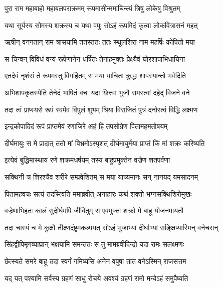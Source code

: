 
\twolineshloka
{पुरा राम महाबाहो महाबलपराक्रमम्}
{रूपमासीन्ममाचिन्त्यं त्रिषु लोकेषु विश्रुतम्} %

\twolineshloka
{यथा सूर्यस्य सोमस्य शक्रस्य च यथा वपुः}
{सोऽहं रूपमिदं कृत्वा लोकवित्रासनं महत्} %

\twolineshloka
{ऋषीन् वनगतान् राम त्रासयामि ततस्ततः}
{ततः स्थूलशिरा नाम महर्षिः कोपितो मया} %

\twolineshloka
{स चिन्वन् विविधं वन्यं रूपेणानेन धर्षितः}
{तेनाहमुक्तः प्रेक्ष्यैवं घोरशापाभिधायिना} %

\twolineshloka
{एतदेवं नृशंसं ते रूपमस्तु विगर्हितम्}
{स मया याचितः क्रुद्धः शापस्यान्तो भवेदिति} %

\twolineshloka
{अभिशापकृतस्येति तेनेदं भाषितं वचः}
{यदा छित्त्वा भुजौ रामस्त्वां दहेद् विजने वने} %

\twolineshloka
{तदा त्वं प्राप्स्यसे रूपं स्वमेव विपुलं शुभम्}
{श्रिया विराजितं पुत्रं दनोस्त्वं विद्धि लक्ष्मण} %

\twolineshloka
{इन्द्रकोपादिदं रूपं प्राप्तमेवं रणाजिरे}
{अहं हि तपसोग्रेण पितामहमतोषयम्} %

\twolineshloka
{दीर्घमायुः स मे प्रादात् ततो मां विभ्रमोऽस्पृशत्}
{दीर्घमायुर्मया प्राप्तं किं मां शक्रः करिष्यति} %

\twolineshloka
{इत्येवं बुद्धिमास्थाय रणे शक्रमधर्षयम्}
{तस्य बाहुप्रमुक्तेन वज्रेण शतपर्वणा} %

\twolineshloka
{सक्थिनी च शिरश्चैव शरीरे सम्प्रवेशितम्}
{स मया याच्यमानः सन् नानयद् यमसादनम्} %

\twolineshloka
{पितामहवचः सत्यं तदस्त्विति ममाब्रवीत्}
{अनाहारः कथं शक्तो भग्नसक्थिशिरोमुखः} %

\twolineshloka
{वज्रेणाभिहतः कालं सुदीर्घमपि जीवितुम्}
{स एवमुक्तः शक्रो मे बाहू योजनमायतौ} %

\twolineshloka
{तदा चास्यं च मे कुक्षौ तीक्ष्णदंष्ट्रमकल्पयत्}
{सोऽहं भुजाभ्यां दीर्घाभ्यां सङ्क्षिप्यास्मिन् वनेचरान्} %

\twolineshloka
{सिंहद्वीपिमृगव्याघ्रान् भक्षयामि समन्ततः}
{स तु मामब्रवीदिन्द्रो यदा रामः सलक्ष्मणः} %

\twolineshloka
{छेत्स्यते समरे बाहू तदा स्वर्गं गमिष्यसि}
{अनेन वपुषा तात वनेऽस्मिन् राजसत्तम} %

\twolineshloka
{यद् यत् पश्यामि सर्वस्य ग्रहणं साधु रोचये}
{अवश्यं ग्रहणं रामो मन्येऽहं समुपैष्यति} %

